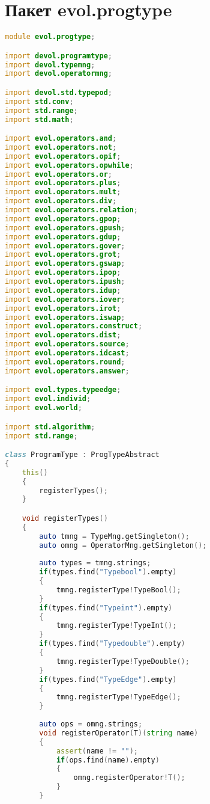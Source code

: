 \documentclass[russian,utf8,emptystyle]{eskdtext}
\begin{document}
\section{Пакет evol.progtype}
\begin{lstlisting}[language=D]
module evol.progtype;

import devol.programtype;
import devol.typemng;
import devol.operatormng;

import devol.std.typepod;
import std.conv;
import std.range;
import std.math;

import evol.operators.and;
import evol.operators.not;
import evol.operators.opif;
import evol.operators.opwhile;
import evol.operators.or;
import evol.operators.plus;
import evol.operators.mult;
import evol.operators.div;
import evol.operators.relation;
import evol.operators.gpop;
import evol.operators.gpush;
import evol.operators.gdup;
import evol.operators.gover;
import evol.operators.grot;
import evol.operators.gswap;
import evol.operators.ipop;
import evol.operators.ipush;
import evol.operators.idup;
import evol.operators.iover;
import evol.operators.irot;
import evol.operators.iswap;
import evol.operators.construct;
import evol.operators.dist;
import evol.operators.source;
import evol.operators.idcast;
import evol.operators.round;
import evol.operators.answer;

import evol.types.typeedge;
import evol.individ;
import evol.world;

import std.algorithm;
import std.range;

class ProgramType : ProgTypeAbstract
{
    this()
    {
        registerTypes();
    }

    void registerTypes()
    {
        auto tmng = TypeMng.getSingleton();
        auto omng = OperatorMng.getSingleton();
        
        auto types = tmng.strings;
        if(types.find("Typebool").empty)
        {
            tmng.registerType!TypeBool();
        }
        if(types.find("Typeint").empty)
        {
            tmng.registerType!TypeInt();
        }
        if(types.find("Typedouble").empty)
        {
            tmng.registerType!TypeDouble();
        }
        if(types.find("TypeEdge").empty)
        {
            tmng.registerType!TypeEdge();
        }
        
        auto ops = omng.strings;
        void registerOperator(T)(string name)
        {
            assert(name != "");
            if(ops.find(name).empty)
            {
                omng.registerOperator!T();
            }
        }
        

\end{lstlisting}
\end{document}
